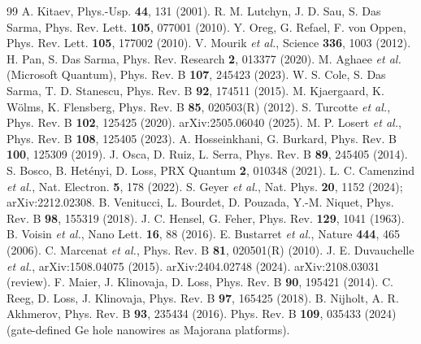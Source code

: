 \documentclass[11pt]{article}
\begin{document}
\begin{thebibliography}{99}\small
{} A. Kitaev, Phys.-Usp. \textbf{44}, 131 (2001).
 R. M. Lutchyn, J. D. Sau, S. Das Sarma, Phys. Rev. Lett.
\textbf{105}, 077001 (2010).
 Y. Oreg, G. Refael, F. von Oppen, Phys. Rev. Lett. \textbf{105},
177002 (2010).
 V. Mourik \emph{et al.}, Science \textbf{336}, 1003 (2012).
 H. Pan, S. Das Sarma, Phys. Rev. Research \textbf{2}, 013377 (2020).
 M. Aghaee \emph{et al.} (Microsoft Quantum), Phys. Rev. B
\textbf{107}, 245423 (2023).
 W. S. Cole, S. Das Sarma, T. D. Stanescu, Phys. Rev. B \textbf{92},
174511 (2015).
 M. Kjaergaard, K. W\"olms, K. Flensberg, Phys. Rev. B \textbf{85},
020503(R) (2012).
 S. Turcotte \emph{et al.}, Phys. Rev. B \textbf{102}, 125425 (2020).
 arXiv:2505.06040 (2025).
 M. P. Losert \emph{et al.}, Phys. Rev. B \textbf{108}, 125405 (2023).
 A. Hosseinkhani, G. Burkard, Phys. Rev. B \textbf{100}, 125309
(2019).
 J. Osca, D. Ruiz, L. Serra, Phys. Rev. B \textbf{89}, 245405 (2014).
 S. Bosco, B. Het\'enyi, D. Loss, PRX Quantum \textbf{2}, 010348 (2021).
 L. C. Camenzind \emph{et al.}, Nat. Electron. \textbf{5}, 178
(2022).
 S. Geyer \emph{et al.}, Nat. Phys. \textbf{20}, 1152 (2024);
arXiv:2212.02308.
 B. Venitucci, L. Bourdet, D. Pouzada, Y.-M. Niquet,
Phys. Rev. B \textbf{98}, 155319 (2018).
 J. C. Hensel, G. Feher, Phys. Rev. \textbf{129}, 1041
(1963).
 B. Voisin \emph{et al.}, Nano Lett. \textbf{16}, 88 (2016).
 E. Bustarret \emph{et al.}, Nature \textbf{444}, 465 (2006).
 C. Marcenat \emph{et al.}, Phys. Rev. B \textbf{81}, 020501(R)
(2010).
 J. E. Duvauchelle \emph{et al.}, arXiv:1508.04075 (2015).
 arXiv:2404.02748 (2024).
 arXiv:2108.03031 (review).
 F. Maier, J. Klinovaja, D. Loss, Phys. Rev. B \textbf{90}, 195421
(2014).
 C. Reeg, D. Loss, J. Klinovaja, Phys. Rev. B \textbf{97}, 165425 (2018).
 B. Nijholt, A. R. Akhmerov, Phys. Rev. B \textbf{93}, 235434 (2016).
 Phys. Rev. B \textbf{109}, 035433 (2024) (gate-defined Ge
hole nanowires as Majorana platforms).
\end{thebibliography}
\end{document}
